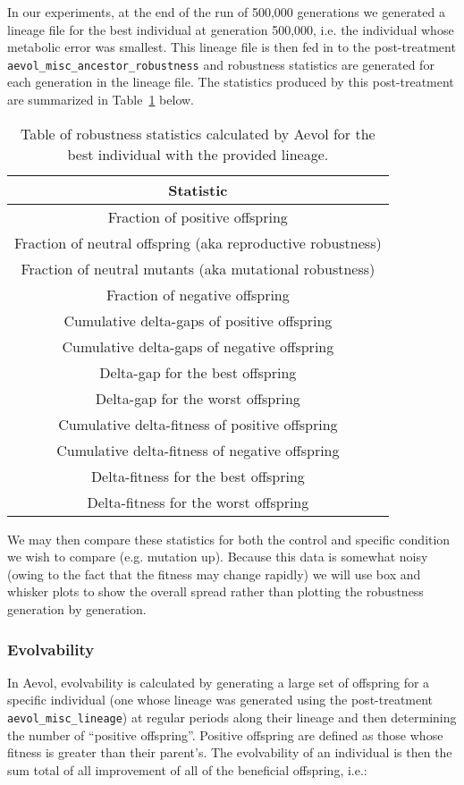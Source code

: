In our experiments, at the end of the run of 500,000 generations we generated a lineage file for the best individual at generation 500,000, i.e. the individual whose metabolic error was smallest. This lineage file is then fed in to the post-treatment \texttt{aevol\_misc\_ancestor\_robustness} and robustness statistics are generated for each generation in the lineage file. The statistics produced by this post-treatment are summarized in Table~\ref{table:robustness} below.
\begin{table}[H]
	\centering
	\begin{tabular}{||c||}
		\hline
		\textbf{Statistic} \\
		\hline \hline
		Fraction of positive offspring \\
		\hline
		Fraction of neutral offspring (aka reproductive robustness) \\
		\hline
		Fraction of neutral mutants (aka mutational robustness) \\
		\hline
		Fraction of negative offspring \\
		\hline
		Cumulative delta-gaps of positive offspring \\
		\hline
		Cumulative delta-gaps of negative offspring \\
		\hline
		Delta-gap for the best offspring \\
		\hline
		Delta-gap for the worst offspring \\
		\hline
		Cumulative delta-fitness of positive offspring \\
		\hline
		Cumulative delta-fitness of negative offspring \\
		\hline
		Delta-fitness for the best offspring \\
		\hline
		Delta-fitness for the worst offspring \\
		\hline
		
	\end{tabular}
	\caption[Aevol robustness statistics]{Table of robustness statistics calculated by Aevol for the best individual with the provided lineage.}
	\label{table:robustness}
\end{table}
We may then compare these statistics for both the control and specific condition we wish to compare (e.g. mutation up). Because this data is somewhat noisy (owing to the fact that the fitness may change rapidly) we will use box and whisker plots to show the overall spread rather than plotting the robustness generation by generation. 
\subsubsection{Evolvability}
In Aevol, evolvability is calculated by generating a large set of offspring for a specific individual (one whose lineage was generated using the post-treatment \texttt{aevol\_misc\_lineage}) at regular periods along their lineage and then determining the number of ``positive offspring''. Positive offspring are defined as those whose fitness is greater than their parent's. The evolvability of an individual is then the sum total of all improvement of all of the beneficial offspring, i.e.:

